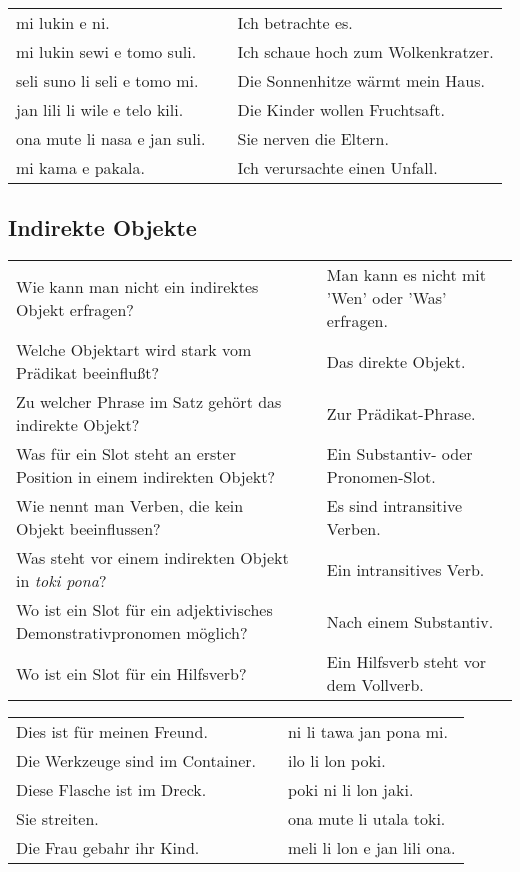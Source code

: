 \begin{supertabular}{p{5,5cm}|ll}
mi lukin e ni. && Ich betrachte es. \\
mi lukin sewi e tomo suli.  && Ich schaue hoch zum Wolkenkratzer. \\
seli suno li seli e tomo mi.  && Die Sonnenhitze wärmt mein Haus. \\
jan lili li wile e telo kili.  && Die Kinder wollen Fruchtsaft. \\
ona mute li nasa e jan suli.  && Sie nerven die Eltern. \\
mi kama e pakala. && Ich verursachte einen Unfall. \\
\end{supertabular} 

\newpage
%
\subsection*{Indirekte Objekte} 
\label{'indirect_objects'}

\begin{supertabular}{p{5,5cm}|ll}
Wie kann man nicht ein indirektes Objekt erfragen?  && Man kann es nicht mit 'Wen' oder 'Was' erfragen. \\ %
Welche Objektart wird stark vom Prädikat beeinflußt? && Das direkte Objekt.  \\ %
Zu welcher Phrase im Satz gehört das indirekte Objekt? && Zur Prädikat-Phrase. \\ %
Was für ein Slot steht an erster Position in einem indirekten Objekt? && Ein Substantiv- oder Pronomen-Slot. \\ %
Wie nennt man Verben, die kein Objekt beeinflussen? && Es sind intransitive Verben.  \\ %
Was steht vor einem indirekten Objekt in \textit{toki pona}? && Ein intransitives Verb. \\ %
Wo ist ein Slot für ein adjektivisches Demonstrativpronomen möglich? && Nach einem Substantiv. \\  %
Wo ist ein Slot für ein Hilfsverb? && Ein Hilfsverb steht vor dem Vollverb. \\ %
\end{supertabular}

\begin{supertabular}{p{5,5cm}|ll}
Dies ist für meinen Freund.   && ni li tawa jan pona mi. \\ %
Die Werkzeuge sind im Container.  && ilo li lon poki. \\ %
Diese Flasche ist im Dreck.  && poki ni li lon jaki. \\ %
Sie streiten.  && ona mute li utala toki. \\ %
Die Frau gebahr ihr Kind. && meli li lon e jan lili ona. \\ %
\end{supertabular} 

